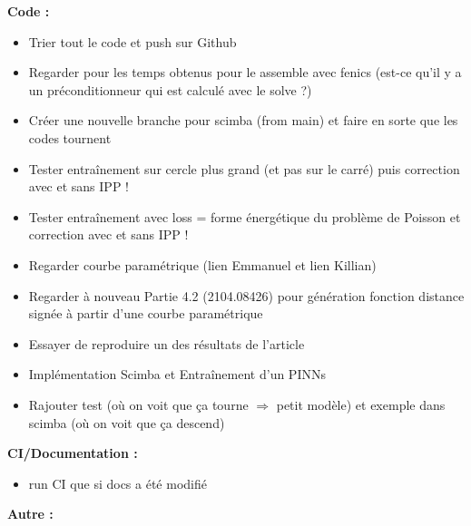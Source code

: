 \textbf{Code :}
\begin{itemize}[label=$\square$] 
	\item[\done] Trier tout le code et push sur Github
	\item Regarder pour les temps obtenus pour le assemble avec fenics (est-ce qu'il y a un préconditionneur qui est calculé avec le solve ?)
	\item Créer une nouvelle branche pour scimba (from main) et faire en sorte que les codes tournent
	\item Tester entraînement sur cercle plus grand (et pas sur le carré) puis correction avec et sans IPP !
	\item Tester entraînement avec loss = forme énergétique du problème de Poisson et correction avec et sans IPP !
	\item Regarder courbe paramétrique (lien Emmanuel et lien Killian)
	\item Regarder à nouveau Partie 4.2 (2104.08426) pour génération fonction distance signée à partir d'une courbe paramétrique
	\item Essayer de reproduire un des résultats de l'article
	\item Implémentation Scimba et Entraînement d'un PINNs
	\item Rajouter test (où on voit que ça tourne $\Rightarrow$ petit modèle) et exemple dans scimba (où on voit que ça descend)
\end{itemize}
\textbf{CI/Documentation :}
\begin{itemize}[label=$\square$] 
	\item run CI que si docs a été modifié
\end{itemize}
\textbf{Autre :}
